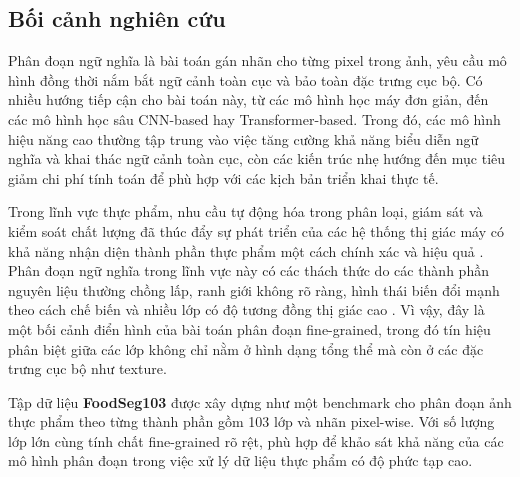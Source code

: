 


\subsection{Bối cảnh nghiên cứu}

Phân đoạn ngữ nghĩa là bài toán gán nhãn cho từng pixel trong ảnh, yêu cầu mô hình đồng thời nắm bắt ngữ cảnh toàn cục và bảo toàn đặc trưng cục bộ. Có nhiều hướng tiếp cận cho bài toán này, từ các mô hình học máy đơn giản, đến các mô hình học sâu CNN-based hay Transformer-based. Trong đó, các mô hình hiệu năng cao thường tập trung vào việc tăng cường khả năng biểu diễn ngữ nghĩa và khai thác ngữ cảnh toàn cục, còn các kiến trúc nhẹ hướng đến mục tiêu giảm chi phí tính toán để phù hợp với các kịch bản triển khai thực tế.

Trong lĩnh vực thực phẩm, nhu cầu tự động hóa trong phân loại, giám sát và kiểm soát chất lượng đã thúc đẩy sự phát triển của các hệ thống thị giác máy có khả năng nhận diện thành phần thực phẩm một cách chính xác và hiệu quả \cite{mahalik2010trends, stemmer2018vision, gao2019smartfridge, wang2019smartrefrigerator}. Phân đoạn ngữ nghĩa trong lĩnh vực này có các thách thức do các thành phần nguyên liệu thường chồng lấp, ranh giới không rõ ràng, hình thái biến đổi mạnh theo cách chế biến và nhiều lớp có độ tương đồng thị giác cao \cite{zhuang2020transfer}. Vì vậy, đây là một bối cảnh điển hình của bài toán phân đoạn fine-grained, trong đó tín hiệu phân biệt giữa các lớp không chỉ nằm ở hình dạng tổng thể mà còn ở các đặc trưng cục bộ như texture.

Tập dữ liệu \textbf{FoodSeg103} \cite{benchmarkfood} được xây dựng như một benchmark cho phân đoạn ảnh thực phẩm theo từng thành phần gồm 103 lớp và nhãn pixel-wise. Với số lượng lớp lớn cùng tính chất fine-grained rõ rệt, phù hợp để khảo sát khả năng của các mô hình phân đoạn trong việc xử lý dữ liệu thực phẩm có độ phức tạp cao.


